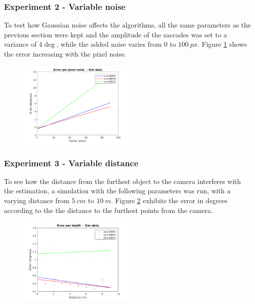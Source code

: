\subsubsection{Experiment 2 - Variable noise}
To test how Gaussian noise affects the algorithms, all the same parameters as the previous section were kept and the amplitude of the saccades was set to a variance of $4 \deg$, while the added noise varies from $0$ to $100 \ px$. Figure \ref{cha5:sec1:noise} shows the error increasing with the pixel noise. 
\begin{figure}[ht]
	\centering
	\includegraphics[width=0.5\textwidth]{images/noise.png}
	\label{cha5:sec1:noise}
\end{figure}

\subsubsection{Experiment 3 - Variable distance}
To see how the distance from the furthest object to the camera interferes with the estimation, a simulation with the following parameters was run, with a varying distance from $5 \ cm$ to $10 \ m$. Figure \ref{cha5:sec1:depthh} exhibits the error in degrees according to the the distance to the furthest points from the camera.
\begin{figure}[ht]
	\centering
	\includegraphics[width=0.5\textwidth]{images/depthh.png}
	\label{cha5:sec1:depthh}
\end{figure}	

